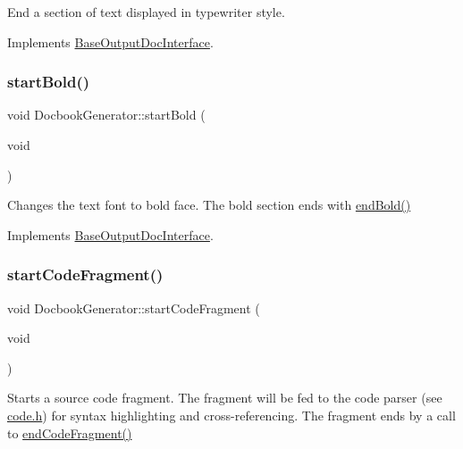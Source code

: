 End a section of text displayed in typewriter style. 

Implements \mbox{\hyperlink{class_base_output_doc_interface_a9e987baf8aed76f0e5e6676b3238d2c8}{Base\+Output\+Doc\+Interface}}.

\mbox{\label{class_docbook_generator_ad1704a02ae2ba6ab019e0c6e570ce218}} 
\subsubsection{\texorpdfstring{startBold()}{startBold()}}
{\footnotesize\ttfamily void Docbook\+Generator\+::start\+Bold (\begin{DoxyParamCaption}\item[{void}]{ }\end{DoxyParamCaption})\hspace{0.3cm}{\ttfamily [virtual]}}

Changes the text font to bold face. The bold section ends with \mbox{\hyperlink{class_docbook_generator_a798fe205e0beedacd6c035c865ae354c}{end\+Bold()}} 

Implements \mbox{\hyperlink{class_base_output_doc_interface_aa0bfe5ef08077a7191ba4666f47c441b}{Base\+Output\+Doc\+Interface}}.

\mbox{\label{class_docbook_generator_a698cf0a67c7e73af0c76cb0cf54e1530}} 
\subsubsection{\texorpdfstring{startCodeFragment()}{startCodeFragment()}}
{\footnotesize\ttfamily void Docbook\+Generator\+::start\+Code\+Fragment (\begin{DoxyParamCaption}\item[{void}]{ }\end{DoxyParamCaption})\hspace{0.3cm}{\ttfamily [virtual]}}

Starts a source code fragment. The fragment will be fed to the code parser (see \mbox{\hyperlink{code_8h_source}{code.\+h}}) for syntax highlighting and cross-\/referencing. The fragment ends by a call to \mbox{\hyperlink{class_docbook_generator_a5f6585ebe5d203c47bb25cefdd30d8fd}{end\+Code\+Fragment()}} 

